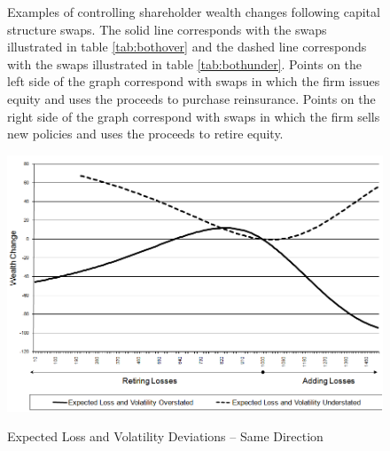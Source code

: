 \begin{figure}\caption{Expected Loss and Volatility Deviations -- Same Direction\label{fig:bothsame}}
\begin{small}Examples of controlling shareholder wealth changes following capital structure swaps.  The solid line corresponds with the swaps illustrated in table \ref{tab:bothover} and the dashed line corresponds with the swaps illustrated in table \ref{tab:bothunder}.  Points on the left side of the graph correspond with swaps in which the firm issues equity and uses the proceeds to purchase reinsurance.  Points on the right side of the graph correspond with swaps in which the firm sells new policies and uses the proceeds to retire equity.\end{small}
\begin{center}
{\includegraphics[type=png,ext=.png,read=.png,width=4.8in]{bothsame}}
\end{center}
\end{figure}


